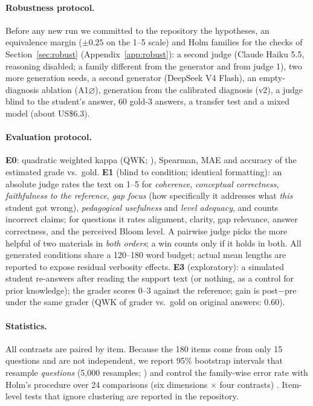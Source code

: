 \documentclass[11pt]{article}
\begin{document}
\paragraph{Robustness protocol.} Before any new run we committed to the repository the hypotheses, an equivalence margin ($\pm 0.25$ on the 1--5 scale) and Holm families for the checks of Section~\ref{sec:robust} (Appendix~\ref{app:robust}): a second judge (Claude Haiku 5.5, reasoning disabled; a family different from the generator and from judge 1), two more generation seeds, a second generator (DeepSeek V4 Flash), an empty-diagnosis ablation (A1$\varnothing$), generation from the calibrated diagnosis (v2), a judge blind to the student's answer, 60 gold-3 answers, a transfer test and a mixed model (about US\$6.3).

\paragraph{Evaluation protocol.}\label{sec:protocol}
\textbf{E0}: quadratic weighted kappa (QWK; \citealp{cohen1968}), Spearman, MAE and accuracy of the estimated grade vs.\ gold.
\textbf{E1} (blind to condition; identical formatting): an absolute judge rates the text on 1--5 for \emph{coherence}, \emph{conceptual correctness}, \emph{faithfulness to the reference}, \emph{gap focus} (how specifically it addresses what \emph{this} student got wrong), \emph{pedagogical usefulness} and \emph{level adequacy}, and counts incorrect claims; for questions it rates alignment, clarity, gap relevance, answer correctness, and the perceived Bloom level. A pairwise judge picks the more helpful of two materials in \emph{both orders}; a win counts only if it holds in both. All generated conditions share a 120--180 word budget; actual mean lengths are reported to expose residual verbosity effects.
\textbf{E3} (exploratory): a simulated student re-answers after reading the support text (or nothing, as a control for prior knowledge); the grader scores 0--3 against the reference; gain is post$-$pre under the same grader (QWK of grader vs.\ gold on original answers: 0.60).

\paragraph{Statistics.} All contrasts are paired by item. Because the 180 items come from only 15 questions and are not independent, we report 95\% bootstrap intervals that resample \emph{questions} (5{,}000 resamples; \citealp{efron1993,field2007}) and control the family-wise error rate with Holm's procedure \citep{holm1979} over 24 comparisons (six dimensions $\times$ four contrasts) \citep[cf.][]{dror2018}. Item-level tests that ignore clustering are reported in the repository.
\end{document}

